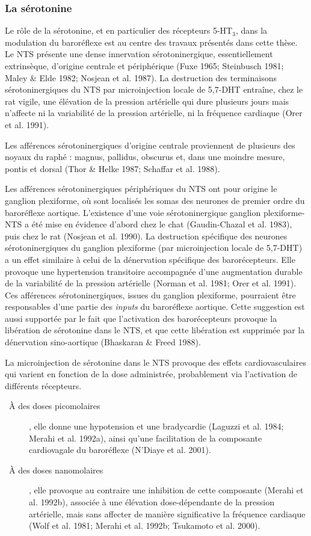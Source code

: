 \documentclass[a4paper,12pt,twoside]{report}
\begin{document}
\subsubsection{La sérotonine}

Le rôle de la sérotonine, et en particulier des récepteurs 5-HT$_{3}$, dans la modulation du baroréflexe est au centre des travaux présentés dans cette thèse.
Le NTS présente une dense innervation sérotoninergique, essentiellement extrinsèque, d’origine centrale et périphérique (Fuxe 1965; Steinbusch 1981; Maley \& Elde 1982; Nosjean et al. 1987). La destruction des terminaisons sérotoninergiques du NTS par microinjection locale de 5,7-DHT entraîne, chez le rat vigile, une élévation de la pression artérielle qui dure plusieurs jours mais n’affecte ni la variabilité de la pression artérielle, ni la fréquence cardiaque (Orer et al. 1991).

Les afférences sérotoninergiques d'origine centrale proviennent de plusieurs des noyaux du raphé : magnus, pallidus, obscurus et, dans une moindre mesure, pontis et dorsal (Thor \& Helke 1987; Schaffar et al. 1988). 

Les afférences sérotoninergiques périphériques du NTS ont pour origine le ganglion plexiforme, où sont localisés les somas des neurones de premier ordre du baroréflexe aortique. L’existence d’une voie sérotoninergique ganglion plexiforme-NTS a été mise en évidence d’abord chez le chat (Gaudin-Chazal et al. 1983), puis chez le rat (Nosjean et al. 1990). La destruction spécifique des neurones sérotoninergiques du ganglion plexiforme (par microinjection locale de 5,7-DHT) a un effet similaire à celui de la dénervation spécifique des barorécepteurs. Elle provoque une hypertension transitoire accompagnée d’une augmentation durable de la variabilité de la pression artérielle (Norman et al. 1981; Orer et al. 1991). Ces afférences sérotoninergiques, issues du ganglion plexiforme, pourraient être responsables d’une partie des \textit{inputs} du baroréflexe aortique. Cette suggestion est aussi supportée par le fait que l’activation des barorécepteurs provoque la libération de sérotonine dans le NTS, et que cette libération est supprimée par la dénervation sino-aortique (Bhaskaran \& Freed 1988). 

La microinjection de sérotonine dans le NTS provoque des effets cardiovasculaires qui varient en fonction de la dose administrée, probablement via l’activation de différents récepteurs.

\begin{description}
\item [\textbullet~\`A des doses picomolaires], elle donne une hypotension et une bradycardie (Laguzzi et al. 1984; Merahi et al. 1992a), ainsi qu’une facilitation de la composante cardiovagale du baroréflexe (N'Diaye et al. 2001). 
\item [\textbullet~\`A des doses nanomolaires], elle provoque au contraire une inhibition de cette composante (Merahi et al. 1992b), associée à une élévation dose-dépendante de la pression artérielle, mais sans affecter de manière significative la fréquence cardiaque (Wolf et al. 1981; Merahi et al. 1992b; Tsukamoto et al. 2000). 
\end{description}
\end{document}
